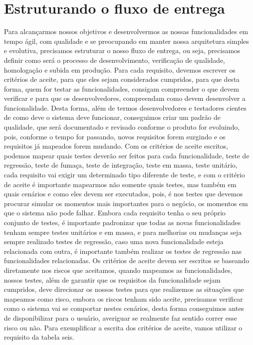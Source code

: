     \section{Estruturando o fluxo de entrega}
      Para alcançarmos nossos objetivos e desenvolvermos as nossas funcionalidades
      em tempo ágil, com qualidade e se preocupando em manter nossa arquitetura
      simples e evolutiva, precisamos estruturar o nosso fluxo de entrega, ou seja,
      precisamos definir como será o processo de desenvolvimento, verificação de
      qualidade, homologação e subida em produção. \newline
      Para cada requisito, devemos escrever os critérios de aceite, para que eles
      sejam considerados cumpridos, para que desta forma, quem for testar as
      funcionalidades, consigam compreender o que devem verificar e para que os
      desenvolvedores, compreendam como devem desenvolver a funcionalidade. Desta
      forma, além de termos desenvolvedores e testadores cientes de como deve
      o sistema deve funcionar, conseguimos criar um padrão de qualidade, que será
      documentado e revisado conforme o produto for evoluindo, pois, conforme o tempo
      for passando, novos requisitos forem surgindo e os requisitos já mapeados
      forem mudando. Com os critérios de aceite escritos, podemos mapear quais
      testes deverão ser feitos para cada funcionalidade, teste de regressão, teste
      de fumaça, teste de integração, teste em massa, teste unitário, cada requisito
      vai exigir um determinado tipo diferente de teste, e com o critério de aceite
      é importante mapearmos não somente quais testes, mas também em quais cenários
      e como eles devem ser executados, pois, é nos testes que devemos procurar simular
      os momentos mais importantes para o negócio, os momentos em que o sistema não
      pode falhar. Embora cada requisito tenha o seu próprio conjunto de testes,
      é importante padronizar que todas as novas funcionalidades tenham sempre testes
      unitários e em massa, e para melhorias ou mudanças seja sempre realizado testes
      de regressão, caso uma nova funcionalidade esteja relacionada com outra, é
      importante também realizar os testes de regressão nas funcionalidades
      relacionadas. Os critérios de aceite devem ser escritos se baseando diretamente
      nos riscos que aceitamos, quando mapeamos as funcionalidades, nossos testes,
      além de garantir que os requisitos da funcionalidade sejam cumpridos, deve
      direcionar os nossos testes para que realizemos as situações que mapeamos como
      risco, embora os riscos tenham sido aceite, precisamos verificar como o sistema
      vai se comportar nestes cenários, desta forma conseguimos antes de disponibilizar
      para o usuário, averiguar se realmente faz sentido correr esse risco ou não. \newline
      Para exemplificar a escrita dos critérios de aceite, vamos utilizar o requisito
      da tabela seis. \newline

